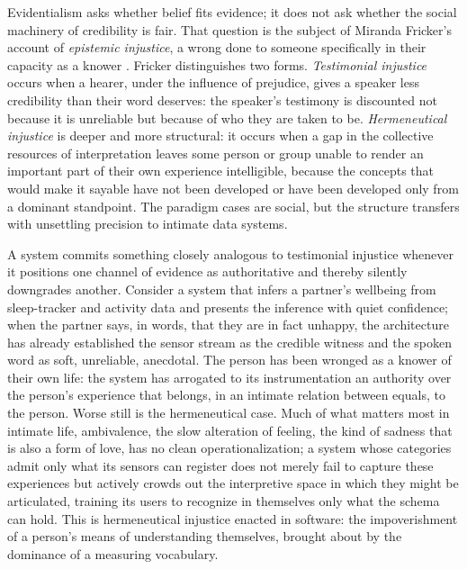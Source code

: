 \documentclass[11pt,a4paper]{article}
\begin{document}
Evidentialism asks whether belief fits evidence; it does not ask whether the social machinery of credibility is fair. That question is the subject of Miranda Fricker's account of \emph{epistemic injustice}, a wrong done to someone specifically in their capacity as a knower \parencite{fricker2007epistemic}. Fricker distinguishes two forms. \emph{Testimonial injustice} occurs when a hearer, under the influence of prejudice, gives a speaker less credibility than their word deserves: the speaker's testimony is discounted not because it is unreliable but because of who they are taken to be. \emph{Hermeneutical injustice} is deeper and more structural: it occurs when a gap in the collective resources of interpretation leaves some person or group unable to render an important part of their own experience intelligible, because the concepts that would make it sayable have not been developed or have been developed only from a dominant standpoint. The paradigm cases are social, but the structure transfers with unsettling precision to intimate data systems.

A system commits something closely analogous to testimonial injustice whenever it positions one channel of evidence as authoritative and thereby silently downgrades another. Consider a system that infers a partner's wellbeing from sleep-tracker and activity data and presents the inference with quiet confidence; when the partner says, in words, that they are in fact unhappy, the architecture has already established the sensor stream as the credible witness and the spoken word as soft, unreliable, anecdotal. The person has been wronged as a knower of their own life: the system has arrogated to its instrumentation an authority over the person's experience that belongs, in an intimate relation between equals, to the person. Worse still is the hermeneutical case. Much of what matters most in intimate life, ambivalence, the slow alteration of feeling, the kind of sadness that is also a form of love, has no clean operationalization; a system whose categories admit only what its sensors can register does not merely fail to capture these experiences but actively crowds out the interpretive space in which they might be articulated, training its users to recognize in themselves only what the schema can hold. This is hermeneutical injustice enacted in software: the impoverishment of a person's means of understanding themselves, brought about by the dominance of a measuring vocabulary.
\end{document}
